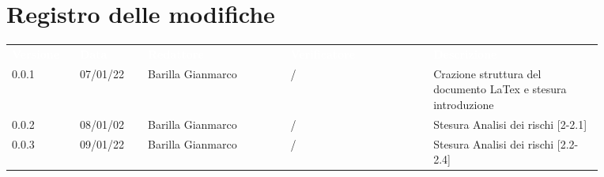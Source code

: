 \section*{Registro delle modifiche}

{\renewcommand{\arraystretch}{1.5}
\begin{tabular}{p{0.10\linewidth}p{0.10\linewidth}p{0.21\linewidth}p{0.21\linewidth}p{0.25\linewidth}}
	\rowcolor[RGB]{33, 73, 50}
	\textcolor{white}{\textbf{Versione}} & \textcolor{white}{\textbf{Data}} & \textcolor{white}
	{\textbf{Redattore}} & \textcolor{white}{\textbf{Verificatore}} & \textcolor{white}
	{\textbf{Descrizione}}\\
	\rowcolor[RGB]{216, 235, 171}
	0.0.1 & 07/01/22 & Barilla Gianmarco & / & Crazione struttura del documento LaTex e stesura introduzione\\
	\rowcolor[RGB]{233, 245, 206}
	0.0.2 & 08/01/02 & Barilla Gianmarco & / & Stesura Analisi dei rischi [2-2.1]\\
	\rowcolor[RGB]{216, 235, 171}
	0.0.3 & 09/01/22 & Barilla Gianmarco& / & Stesura Analisi dei rischi [2.2-2.4]\\
	
\end{tabular}	
}